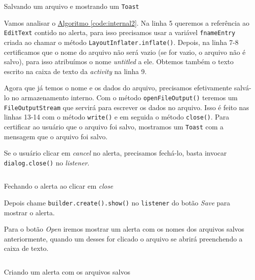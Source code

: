 \documentclass[a4paper,12pt,brazil,oneside]{book}
\begin{document}
		\begin{listing}[H]
		\inputminted[linenos=true,fontsize=\small,frame=lines, framesep=2mm, tabsize=2,numbersep=5pt]{java}{src/api/storage/internal2.java}
		\caption{Salvando um arquivo e mostrando um \texttt{Toast}}
		\label{code:internal2}
		\end{listing} 	

		Vamos analisar o \hyperref[code:internal2]{Algoritmo \ref*{code:internal2}}. Na linha 5 queremos a referência ao \texttt{EditText} contido no alerta, para isso precisamos usar a variável \texttt{fnameEntry} criada ao chamar o método \texttt{LayoutInflater.inflate()}. Depois, na linha 7-8 certificamos que o nome do arquivo não será vazio (se for vazio, o arquivo não é salvo), para isso atribuímos o nome \emph{untitled} a ele. Obtemos também o texto escrito na caixa de texto da \emph{activity} na linha 9.

		Agora que já temos o nome e os dados do arquivo, precisamos efetivamente salvá-lo no armazenamento interno. Com o método \texttt{openFileOutput()} teremos um \texttt{FileOutputStream} que servirá para escrever os dados no arquivo. Isso é feito nas linhas 13-14 com o método \texttt{write()} e em seguida o método \texttt{close()}.
		Para certificar ao usuário que o arquivo foi salvo, mostramos um \texttt{Toast} com a mensagem que o arquivo foi salvo.

		Se o usuário clicar em \emph{cancel} no alerta, precisamos fechá-lo, basta invocar \texttt{dialog.close()} no \emph{listener}.

		\begin{listing}[H]
		\inputminted[linenos=true,fontsize=\small,frame=lines, framesep=2mm, tabsize=2,numbersep=5pt]{java}{src/api/storage/internal3.java}
		\caption{Fechando o alerta ao clicar em \emph{close}}
		\label{code:internal3}
		\end{listing} 	

		Depois chame \texttt{builder.create().show()} no \texttt{listener} do botão \emph{Save} para mostrar o alerta.
 
		Para o botão \emph{Open} iremos mostrar um alerta com os nomes dos arquivos salvos anteriormente, quando um desses for clicado o arquivo se abrirá preenchendo a caixa de texto.

		\begin{listing}[H]
		\inputminted[linenos=true,fontsize=\small,frame=lines, framesep=2mm, tabsize=2,numbersep=5pt]{java}{src/api/storage/internal4.java}
		\caption{Criando um alerta com os arquivos salvos}
		\label{code:internal4}
		\end{listing} 	
	
\end{document}
